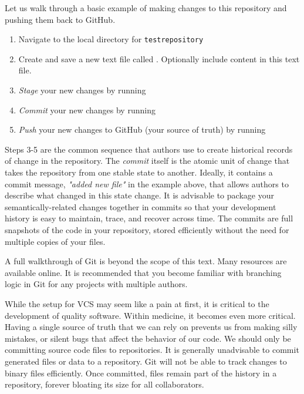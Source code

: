 Let us walk through a basic example of making changes to this repository and pushing them back to GitHub.

\begin{enumerate}
    \item Navigate to the local directory for \texttt{test\textunderscore repository}
    \item Create and save a new text file called . Optionally include content in this text file.
    \item \textit{Stage} your new changes by running 
    \item \textit{Commit} your new changes by running 
    \item \textit{Push} your new changes to GitHub (your source of truth) by running 
\end{enumerate}

Steps 3-5 are the common sequence that authors use to create historical records of change in the repository. The \textit{commit} itself is the atomic unit of change that takes the repository from one stable state to another. Ideally, it contains a commit message, \textit{"added new file"} in the example above, that allows authors to describe what changed in this state change.
It is advisable to package your semantically-related changes together in commits so that your development history is easy to maintain, trace, and recover across time. The commits are full snapshots of the code in your repository, stored efficiently without the need for multiple copies of your files.

A full walkthrough of Git is beyond the scope of this text. Many resources are available online. It is recommended that you become familiar with branching logic in Git for any projects with multiple authors.

While the setup for VCS may seem like a pain at first, it is critical to the development of quality software.
Within medicine, it becomes even more critical. Having a single source of truth that we can rely on prevents us from making silly mistakes, or silent bugs that affect the behavior of our code. We should only be committing source code files to repositories. It is generally unadvisable to commit generated files or data to a repository. Git will not be able to track changes to binary files efficiently. Once committed, files remain part of the history in a repository, forever bloating its size for all collaborators.

